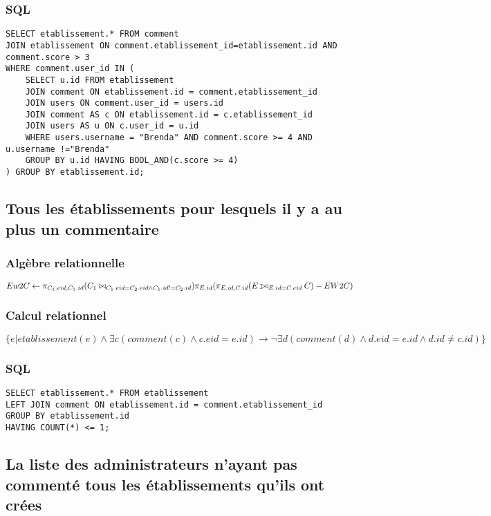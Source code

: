\subsubsection{SQL}
\begin{lstlisting}
SELECT etablissement.* FROM comment
JOIN etablissement ON comment.etablissement_id=etablissement.id AND comment.score > 3
WHERE comment.user_id IN (
    SELECT u.id FROM etablissement
    JOIN comment ON etablissement.id = comment.etablissement_id
    JOIN users ON comment.user_id = users.id
    JOIN comment AS c ON etablissement.id = c.etablissement_id
    JOIN users AS u ON c.user_id = u.id
    WHERE users.username = "Brenda" AND comment.score >= 4 AND u.username !="Brenda"
    GROUP BY u.id HAVING BOOL_AND(c.score >= 4)
) GROUP BY etablissement.id;
\end{lstlisting}

\subsection{Tous les établissements pour lesquels il y a au plus un commentaire}
\subsubsection{Algèbre relationnelle}
\(
Ew2C \leftarrow \pi_{C_1.eid, C_1.id}(C_1 \join_{C_1.eid=C_2.eid \land C_1.id != C_2.id})
\\
\pi_{E.id}(\pi_{E.id, C.id}(E \leftouterjoin_{E.id=C.eid}  C) - EW2C)
\)
\subsubsection{Calcul relationnel}

\(
\{e | etablissement(e) \land \exists c(comment(c) \land c.eid = e.id) \rightarrow \neg\exists d(comment(d) \land d.eid = e.id \land d.id \neq c.id)\}
\)
\subsubsection{SQL}
\begin{lstlisting}
SELECT etablissement.* FROM etablissement
LEFT JOIN comment ON etablissement.id = comment.etablissement_id
GROUP BY etablissement.id
HAVING COUNT(*) <= 1;
\end{lstlisting}

\subsection{La liste des administrateurs n’ayant pas commenté tous les établissements qu’ils ont crées}
